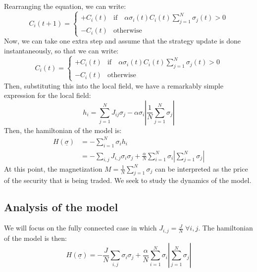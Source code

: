 Rearranging the equation, we can write:
\begin{equation}
    C_i(t+1) = \begin{cases}
        +C_i(t) & \text{if} \quad \alpha\sigma_i(t)C_i(t) \sum_{j=1}^N \sigma_j(t)> 0\\
        -C_i(t) & \text{otherwise}
    \end{cases}
\end{equation}
Now, we can take one extra step and assume that the strategy update is done instantaneously, so that we can  write:
\begin{equation}
    C_i(t) = \begin{cases}
        +C_i(t) & \text{if} \quad \alpha\sigma_i(t)C_i(t) \sum_{j=1}^N \sigma_j(t)> 0\\
        -C_i(t) & \text{otherwise}
    \end{cases}
\end{equation}
Then, substituting this into the local field, we have a remarkably simple expression for the local field:
\begin{equation}
    h_i=\sum_{j=1}^N J_{i j} \sigma_j-\alpha \sigma_i \left | \frac{1}{N}\sum_{j=1}^N \sigma_j \right |
\end{equation}
Then, the hamiltonian of the model is:
\begin{equation}
    \begin{aligned}
        H(\underline{\sigma}) &= -\sum_{i=1}^N \sigma_i h_i\\
        &= -\sum_{i,j}J_{i,j}\sigma_i\sigma_j + \frac{\alpha}{N}\sum_{i=1}^N \sigma_i \left | \sum_{j=1}^N \sigma_j \right |
    \end{aligned}
\end{equation}
At this point, the magnetization \(M = \frac{1}{N}\sum_{j=1}^N \sigma_j\) can be interpreted as the price of the security that is being traded. We seek to study the dynamics of the model.

\subsection{Analysis of the model}
We will focus on the fully connected case in which \(J_{i,j}=\frac{J}{N} \; \forall i,j\). The hamiltonian of the model is then:
\begin{equation}
    H(\underline{\sigma}) = -\frac{J}{N}\sum_{i,j}\sigma_i\sigma_j + \frac{\alpha}{N}\sum_{i=1}^N \sigma_i \left | \sum_{j=1}^N \sigma_j \right |
\end{equation}

